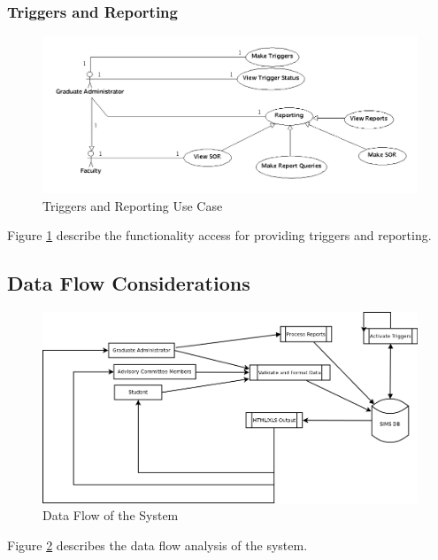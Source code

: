 \documentclass{journal}
\begin{document}
\subsubsection{Triggers and Reporting}
\begin{figure}[htp]
\centering
\includegraphics[scale=0.5]{diagrams/use_cases/triggers_uc.png}
\caption{Triggers and Reporting Use Case}
\label{fig:Triggers}
\end{figure}

Figure \ref{fig:Triggers} describe the functionality access for providing triggers and reporting. 

\subsection{ Data Flow Considerations }

\begin{figure}[htp]
\centering
\includegraphics[scale=0.5]{diagrams/data_flow/dataflowdiagram.png}
\caption{Data Flow of the System}
\label{fig:DataFlow}
\end{figure}

Figure \ref{fig:DataFlow} describes the data flow analysis of the system. 
\end{document}
